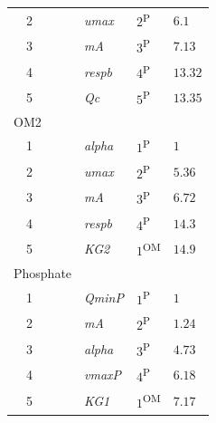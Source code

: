 \documentclass[letterpaper,12pt,oneside]{article}\usepackage[]{graphicx}\usepackage[]{color}
\begin{document}
\begin{table}[!tbp]
{\begin{center}
\begin{tabular}{llll}
~~2&\footnotesize{\textit{umax}}&$2$\textsuperscript{P}&$6.1$\tabularnewline
~~3&\footnotesize{\textit{mA}}&$3$\textsuperscript{P}&$7.13$\tabularnewline
~~4&\footnotesize{\textit{respb}}&$4$\textsuperscript{P}&$13.32$\tabularnewline
~~5&\footnotesize{\textit{Qc}}&$5$\textsuperscript{P}&$13.35$\tabularnewline
\hline
{OM2}&&&\tabularnewline
~~1&\footnotesize{\textit{alpha}}&$1$\textsuperscript{P}&$1$\tabularnewline
~~2&\footnotesize{\textit{umax}}&$2$\textsuperscript{P}&$5.36$\tabularnewline
~~3&\footnotesize{\textit{mA}}&$3$\textsuperscript{P}&$6.72$\tabularnewline
~~4&\footnotesize{\textit{respb}}&$4$\textsuperscript{P}&$14.3$\tabularnewline
~~5&\footnotesize{\textit{KG2}}&$1$\textsuperscript{OM}&$14.9$\tabularnewline
\hline
{Phosphate}&&&\tabularnewline
~~1&\footnotesize{\textit{QminP}}&$1$\textsuperscript{P}&$1$\tabularnewline
~~2&\footnotesize{\textit{mA}}&$2$\textsuperscript{P}&$1.24$\tabularnewline
~~3&\footnotesize{\textit{alpha}}&$3$\textsuperscript{P}&$4.73$\tabularnewline
~~4&\footnotesize{\textit{vmaxP}}&$4$\textsuperscript{P}&$6.18$\tabularnewline
~~5&\footnotesize{\textit{KG1}}&$1$\textsuperscript{OM}&$7.17$\tabularnewline
\hline
\end{tabular}\end{center}}

\end{table}
\end{document}

